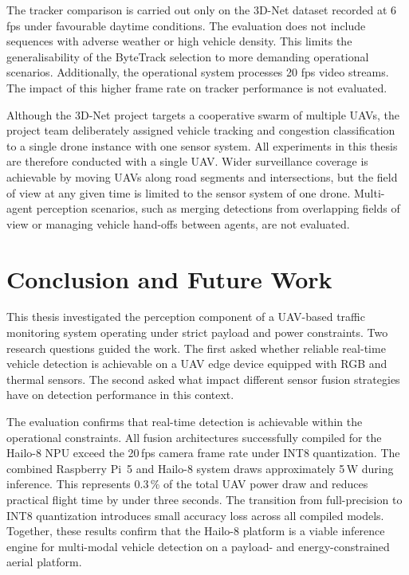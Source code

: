 \documentclass[12pt,oneside,bibtotoc,liststotoc]{scrbook}
\begin{document}
The tracker comparison is carried out only on the 3D-Net dataset recorded at 6 fps under
favourable daytime conditions. The evaluation does not include sequences with adverse
weather or high vehicle density. This limits the generalisability of the ByteTrack
selection to more demanding operational scenarios. Additionally, the operational system
processes 20 fps video streams. The impact of this higher frame rate on tracker performance
is not evaluated.

Although the 3D-Net project targets a cooperative swarm of multiple UAVs, the project team
deliberately assigned vehicle tracking and congestion classification to a single drone
instance with one sensor system.
All experiments in this thesis are therefore conducted with a single UAV. Wider surveillance
coverage is achievable by moving UAVs along road segments and intersections, but the field
of view at any given time is limited to the sensor system of one drone. Multi-agent
perception scenarios, such as merging detections from overlapping fields of view or managing
vehicle hand-offs between agents, are not evaluated.

\newpage
\chapter{Conclusion and Future Work}
\label{chap:conclusion}

This thesis investigated the perception component of a UAV-based traffic monitoring system
operating under strict payload and power constraints. Two research questions guided the work.
The first asked whether reliable real-time vehicle detection is achievable on a UAV edge
device equipped with RGB and thermal sensors. The second asked what impact different sensor
fusion strategies have on detection performance in this context.

The evaluation confirms that real-time detection is achievable within the operational
constraints. All fusion architectures successfully compiled for the Hailo-8 NPU exceed the
20\,fps camera frame rate under INT8 quantization. The combined Raspberry Pi~5 and Hailo-8
system draws approximately 5\,W during inference. This represents 0.3\,\% of the total UAV
power draw and reduces practical flight time by under three seconds. The transition from
full-precision to INT8 quantization introduces small accuracy loss across all compiled
models. Together, these results confirm that the Hailo-8 platform is a viable inference
engine for multi-modal vehicle detection on a payload- and energy-constrained aerial
platform.
\end{document}
